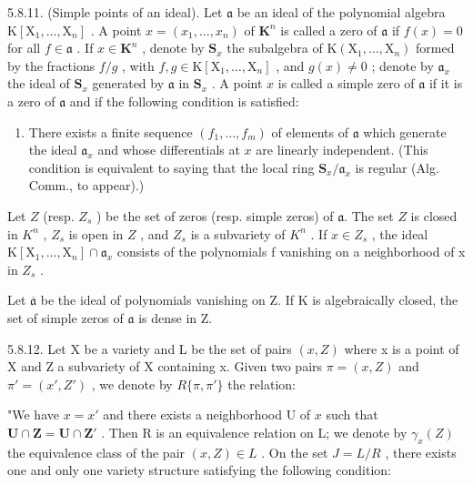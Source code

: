 5.8.11. (Simple points of an ideal). Let \(\mathfrak{a}\) be an ideal of the polynomial algebra \(\mathrm{K}[\mathrm{X}_1,\ldots ,\mathrm{X}_n]\) . A point \(x = (x_{1},\dots,x_{n})\) of \(\mathbf{K}^n\) is called a zero of \(\mathfrak{a}\) if \(f(x) = 0\) for all \(f\in \mathfrak{a}\) . If \(x\in \mathbf{K}^n\) , denote by \(\mathbf{S}_x\) the subalgebra of \(\mathrm{K}(\mathrm{X}_1,\dots,\mathrm{X}_n)\) formed by the fractions \(f / g\) , with \(f,g\in \mathrm{K}[\mathrm{X}_1,\dots,\mathrm{X}_n]\) , and \(g(x)\neq 0\) ; denote by \(\mathfrak{a}_x\) the ideal of \(\mathbf{S}_x\) generated by \(\mathfrak{a}\) in \(\mathbf{S}_x\) . A point \(x\) is called a simple zero of \(\mathfrak{a}\) if it is a zero of \(\mathfrak{a}\) and if the following condition is satisfied:

\begin{enumerate}
\def\labelenumi{(\Alph{enumi})}
\setcounter{enumi}{18}
\tightlist
\item
  There exists a finite sequence \((f_1, \ldots, f_m)\) of elements of \(\mathfrak{a}\) which generate the ideal \(\mathfrak{a}_x\) and whose differentials at \(x\) are linearly independent. (This condition is equivalent to saying that the local ring \(\mathbf{S}_x / \mathfrak{a}_x\) is regular (Alg. Comm., to appear).)
\end{enumerate}

Let \(Z\) (resp. \(Z_s\) ) be the set of zeros (resp. simple zeros) of \(\mathfrak{a}\). The set \(Z\) is closed in \(K^n\) , \(Z_s\) is open in \(Z\) , and \(Z_s\) is a subvariety of \(K^{n}\) . If \(x \in Z_{s}\) , the ideal \(\mathrm{K}[\mathrm{X}_{1}, \ldots, \mathrm{X}_{n}] \cap \mathfrak{a}_{x}\) consists of the polynomials f vanishing on a neighborhood of x in \(Z_{s}\) .

Let \(\overline{\mathfrak{a}}\) be the ideal of polynomials vanishing on Z. If K is algebraically closed, the set of simple zeros of \(\mathfrak{a}\) is dense in Z.

5.8.12. Let X be a variety and L be the set of pairs \((x, Z)\) where x is a point of X and Z a subvariety of X containing x. Given two pairs \(\pi = (x, Z)\) and \(\pi' = (x', Z')\) , we denote by \(R\{\pi, \pi'\}\) the relation:

"We have \(x = x'\) and there exists a neighborhood U of \(x\) such that \(\mathbf{U} \cap \mathbf{Z} = \mathbf{U} \cap \mathbf{Z'}\) . Then R is an equivalence relation on L; we denote by \(\gamma_x(Z)\) the equivalence class of the pair \((x, Z) \in L\) . On the set \(J = L/R\) , there exists one and only one variety structure satisfying the following condition:

